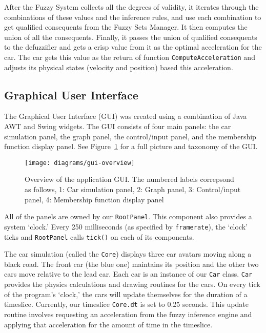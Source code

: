 \documentclass[12pt,letterpaper,oneside]{report}
\newcommand \java[1]{\texttt{#1}}
\begin{document}
After the Fuzzy System collects all the degrees of validity, it iterates
through the combinations of these values and the inference rules,  and use each
combination to get qualified consequents from the Fuzzy Sets Manager. It then
computes the union of all the consequents. Finally, it passes the union of
qualified consequents to the defuzzifier and gets a crisp value from  it as the
optimal acceleration for the car. The car gets this value as the return of
function \texttt{ComputeAcceleration} and adjusts its physical states (velocity
and position) based this acceleration.

\clearpage
\subsection{Graphical User Interface}

The Graphical User Interface (GUI) was created using a combination of
Java AWT and Swing widgets. The GUI consists of four main panels: the
car simulation panel, the graph panel, the control/input panel, and
the membership function display panel. See Figure~\ref{fig:guidiagram} for a
full picture and taxonomy of the GUI.

\begin{figure}[h]
\centering
\texttt{[image: diagrams/gui-overview]}
\caption{Overview of the application GUI. The numbered labels correpsond
as follows, 1: Car simulation panel, 2: Graph panel, 3: Control/input panel, 
4: Membership function display panel} \label{fig:guidiagram}
\end{figure}

All of the panels are owned by our \java{RootPanel}. This component also
provides a system `clock.' Every 250 milliseconds (as specified by
\java{framerate}), the `clock' ticks and \java{RootPanel} calls \java{tick()} on
each of its components.

The car simulation (called the \java{Core}) displays three car avatars moving
along a black road. The front car (the blue one) maintains its position and the
other two cars move relative to the lead car. Each car is an instance of our
\java{Car} class. \java{Car} provides the physics calculations and drawing
routines for the cars. On every tick of the program's `clock,' the cars will
update themselves for the duration of a timeslice.  Currently, our timeslice
\java{Core.dt} is set to 0.25 seconds. This update routine involves requesting
an acceleration from the fuzzy inference engine and applying that acceleration
for the amount of time in the timeslice.
\end{document}
